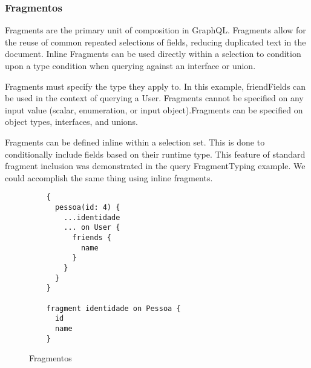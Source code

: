 \subsubsection[Fragmentos]{Fragmentos}

Fragments are the primary unit of composition in GraphQL. Fragments allow for the reuse of common repeated selections of fields, reducing duplicated text in the document. Inline Fragments can be used directly within a selection to condition upon a type condition when querying against an interface or union.

Fragments must specify the type they apply to. In this example, friendFields can be used in the context of querying a User. Fragments cannot be specified on any input value (scalar, enumeration, or input object).Fragments can be specified on object types, interfaces, and unions.

Fragments can be defined inline within a selection set. This is done to conditionally include fields based on their runtime type. This feature of standard fragment inclusion was demonstrated in the query FragmentTyping example. We could accomplish the same thing using inline fragments.

\begin{figure}[H]
  \centering
  \begin{verbatim}
    {
      pessoa(id: 4) {
        ...identidade
        ... on User {
          friends {
            name
          }
        }
      }
    }

    fragment identidade on Pessoa {
      id
      name
    }
  \end{verbatim}
  \caption{Fragmentos}
\end{figure}
